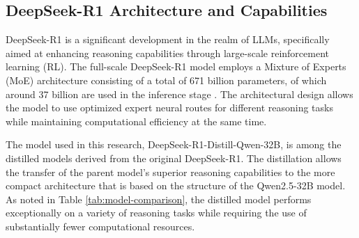 \subsection{DeepSeek-R1 Architecture and Capabilities}
\label{subsec:deepseek-architecture}

DeepSeek-R1 is a significant development in the realm of LLMs, specifically aimed at enhancing reasoning capabilities through large-scale reinforcement learning (RL). The full-scale DeepSeek-R1 model employs a Mixture of Experts (MoE) architecture consisting of a total of 671 billion parameters, of which around 37 billion are used in the inference stage \cite{guo2025deepseek}. The architectural design allows the model to use optimized expert neural routes for different reasoning tasks while maintaining computational efficiency at the same time.

The model used in this research, DeepSeek-R1-Distill-Qwen-32B, is among the distilled models derived from the original DeepSeek-R1. The distillation allows the transfer of the parent model's superior reasoning capabilities to the more compact architecture that is based on the structure of the Qwen2.5-32B model. As noted in Table \ref{tab:model-comparison}, the distilled model performs exceptionally on a variety of reasoning tasks while requiring the use of substantially fewer computational resources.

\begin{center}
    
    \vspace{1pt}
    \label{tab:model-comparison}
\end{center}

